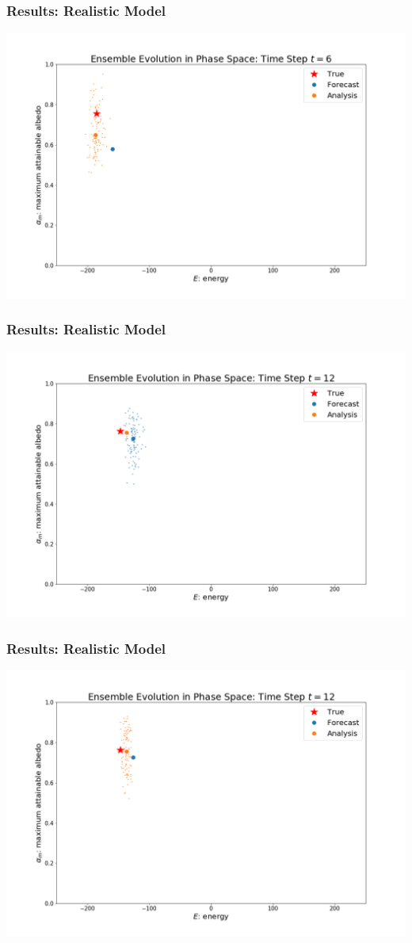 \documentclass{beamer}
\begin{document}
\begin{frame}
\frametitle{Results: Realistic Model}
\centering
\includegraphics[width=\linewidth]{Figures/EnsembleEvolution_analysis_t=6.png}
\end{frame}
\begin{frame}
\frametitle{Results: Realistic Model}
\centering
\includegraphics[width=\linewidth]{Figures/EnsembleEvolution_forecast_t=12.png}
\end{frame}
\begin{frame}
\frametitle{Results: Realistic Model}
\centering
\includegraphics[width=\linewidth]{Figures/EnsembleEvolution_analysis_t=12.png}
\end{frame}
\end{document}
